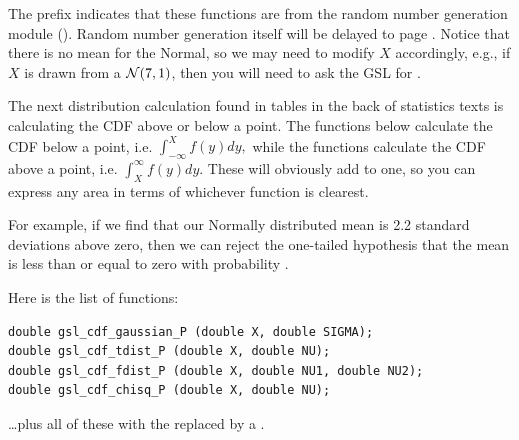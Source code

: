 The prefix  indicates that these
functions are from the random number generation module
(). Random number generation itself will be
delayed to page \pageref{randomnumbers}. Notice that there is no mean
for the Normal, so we may need to modify $X$ accordingly, e.g., if $X$
is drawn from a ${\cal N}(7,1)$, then you will need to ask the GSL for 
.


The next distribution calculation found in tables in the back of
statistics texts is calculating the CDF above or below a point. 
The functions below calculate the CDF below a point, i.e.
$\int_{-\infty}^X f(y) dy,$
while the functions calculate the CDF above a point, i.e.
$\int^{\infty}_X f(y) dy.$
These will obviously add to one, so you can express any area in terms of whichever function is clearest.

For example, if we find that our Normally distributed mean is 2.2 standard
deviations above zero, then we can reject the one-tailed hypothesis that
the mean is less than or equal to zero with probability .

Here is the list of functions:
\begin{lstlisting}
double gsl_cdf_gaussian_P (double X, double SIGMA);
double gsl_cdf_tdist_P (double X, double NU);
double gsl_cdf_fdist_P (double X, double NU1, double NU2);
double gsl_cdf_chisq_P (double X, double NU);
\end{lstlisting}
\dots plus all of these with the  replaced by a .


